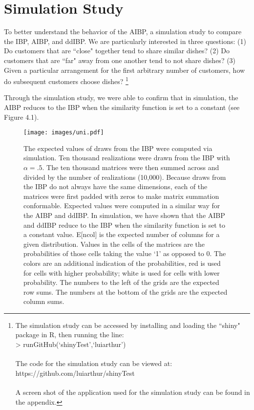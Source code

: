 \section{Simulation Study}
To better understand the behavior of the AIBP, a simulation study to compare
the IBP, AIBP, and ddIBP. We are particularly interested in three questions: 
(1) Do customers that are ``close" together tend to share similar dishes?
(2) Do customers that are ``far" away from one another tend to not share dishes?
(3) Given a particular arrangement for the first arbitrary number of customers,
how do subsequent customers choose dishes? 
\footnote{The simulation study can be accessed by installing and loading the
``shiny" package in R, then running the line: \\
> runGitHub(`shinyTest',`luiarthur')\\\\
The code for the simulation study can be viewed at: \\
https://github.com/luiarthur/shinyTest\\\\
A screen shot of the application used for the 
simulation study can be found in the appendix.}

\noindent
Through the simulation study, we were able to confirm that in simulation, the
AIBP reduces to the IBP when the similarity function is set to a constant (see
Figure 4.1).\\

\begin{figure}\begin{center}
  \texttt{[image: images/uni.pdf]}
  \caption{The expected values of draws from the IBP were computed via simulation.
           Ten thousand realizations were drawn from the IBP with $\alpha=.5$.
           The ten thousand matrices were then summed across and divided by the
           number of realizations (10,000). Because draws from the IBP do not
           always have the same dimensions, each of the matrices were first padded
           with zeros to make matrix summation conformable. Expected values were
           computed in a similar way for the AIBP and ddIBP. In simulation, we
           have shown that the AIBP and ddIBP reduce to the IBP when the similarity
           function is set to a constant value. E[ncol] is the expected number of
           columns for a given distribution. Values in the cells of the matrices
           are the probabilities of those cells taking the value `1' as opposed
           to 0. The colors are an additional indication of the probabilities,
           red is used for cells with higher probability; white is used for cells
           with lower probability. The numbers to the left of the grids are the 
           expected row sums. The numbers at the bottom of the grids are the
           expected column sums.}
\end{center}\end{figure}
\noindent

